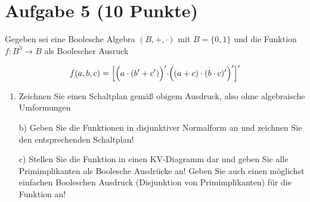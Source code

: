 \section*{Aufgabe 5 (10 Punkte)}

Gegeben sei eine Boolesche Algebra $(B, +, \cdot)$ mit $B = \{0, 1\}$ und die Funktion $f: B^3 \rightarrow B$ als Boolescher Ausruck

$$
f(a, b, c) = \Bigl[ \Bigl(a \cdot (b' + c') \Bigl)' \cdot \Bigl((a + c) \cdot (b \cdot c)'\Bigl)'\Bigl]'
$$

\begin{enumerate}[label={a)}, leftmargin=*]
\item Zeichnen Sie einen Schaltplan gemäß obigem Ausdruck, also ohne algebraische Umformungen
\item[b)] Geben Sie die Funktionen in disjunktiver Normalform an und zeichnen Sie den entsprechenden Schaltplan!
\item[c)] Stellen Sie die Funktion in einen KV-Diagramm dar und geben Sie alle Primimplikanten als Boolesche Ausdrücke an! Geben Sie auch einen möglichst einfachen Booleschen Ausdruck (Disjunktion von Primimplikanten) für die Funktion an!
\end{enumerate}
